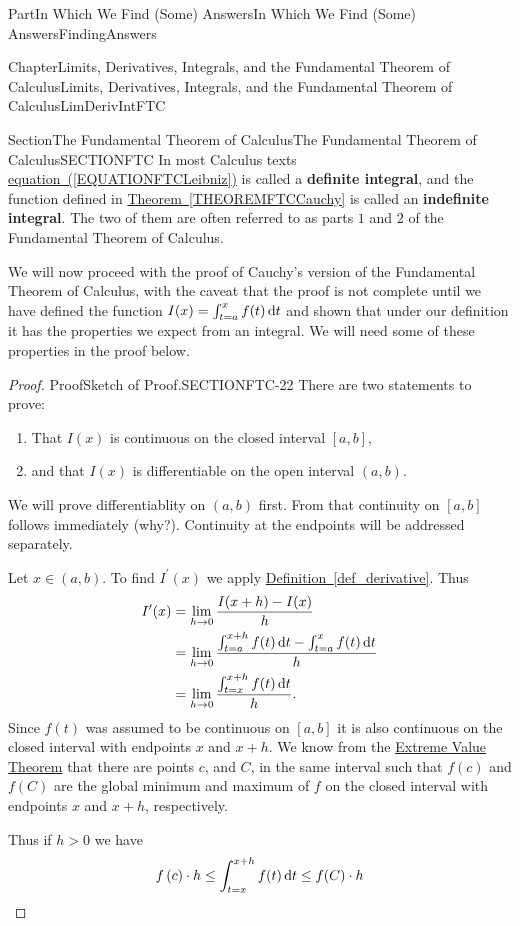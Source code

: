 \documentclass[oneside,10pt,]{book}
\newcommand{\xreffont}{\relax}
\newcommand{\terminology}[1]{\textbf{#1}}
\numberwithin{equation}{part}
\newcommand{\dx}[1]{\,{\rm d}#1}
\def\limit#1#2#3{{\displaystyle\lim_{#1\rightarrow #2}#3}}
\newcommand{\gt}{>}
\newcommand{\amp}{&}
\begin{document}
\begin{partptx}{Part}{In Which We Find (Some) Answers}{}{In Which We Find (Some) Answers}{}{}{FindingAnswers}
\begin{chapterptx}{Chapter}{Limits, Derivatives, Integrals, and the Fundamental Theorem of Calculus}{}{Limits, Derivatives, Integrals, and the Fundamental Theorem of Calculus}{}{}{LimDerivIntFTC}
\begin{sectionptx}{Section}{The Fundamental Theorem of Calculus}{}{The Fundamental Theorem of Calculus}{}{}{SECTIONFTC}
In most Calculus texts \hyperref[EQUATIONFTCLeibniz]{equation~({\xreffont\ref{EQUATIONFTCLeibniz}})} is called a \terminology{definite integral}, and the function defined in \hyperref[THEOREMFTCCauchy]{Theorem~{\xreffont\ref{THEOREMFTCCauchy}}} is called an \terminology{indefinite integral}. The two of them are often referred to as parts \(1\) and \(2\) of the Fundamental Theorem of Calculus.%
\par
We will now proceed with the proof of Cauchy's version of the Fundamental Theorem of Calculus, with the caveat that the proof is not complete until we have defined the function \(I(x)=\int_{t=a}^x f(t)\dx{t}\) and shown that under our definition it has the properties we expect from an integral. We will need some of these properties in the proof below.%
\begin{proof}{Proof}{Sketch of Proof.}{SECTIONFTC-22}
There are two statements to prove:%
\begin{enumerate}
\item{}That \(I(x)\) is continuous on the closed interval \([a,b]\),%
\item{}and that \(I(x)\) is differentiable on the open interval \((a,b)\).%
\end{enumerate}
We will prove differentiablity on \((a,b)\) first. From that continuity on \([a,b]\) follows immediately (why?). Continuity at the endpoints will be addressed separately.%
\par
Let \(x\in (a,b)\). To find \(I^\prime (x)\) we apply \hyperref[def_derivative]{Definition~{\xreffont\ref{def_derivative}}}. Thus%
\begin{align*}
I^\prime (x)\amp{} = \limit{h}{0}{\frac{I(x+h)-I(x)}{h}}\\
\amp{} =       \limit{h}{0}{\frac{\int_{t=a}^{x+h}f(t)\dx{t}-\int_{t=a}^x
f(t)\dx{t}}{h}}\\
\amp{}=\limit{h}{0}{\frac{\int_{t=x}^{x+h}f(t)\dx{t}}{h}}.
\end{align*}
        Since \(f(t)\) was assumed to be continuous on \([a,b]\) it is also continuous on the closed interval with endpoints \(x\) and \(x+h\). We know from the \hyperref[thm_EVT]{Extreme Value Theorem} that there are points \(c\), and \(C\), in the same interval such that \(f(c)\) and \(f(C)\) are the global minimum and maximum of \(f\) on the closed interval with endpoints \(x\) and  \(x+h\), respectively.%
\par
Thus if \(h\gt0\) we have%
\begin{equation*}
f\left(c\right)\cdot h\le
\int^{x+h}_{t=x}{f(t)\dx{t}}\le f(C)\cdot h

\end{equation*}
\end{proof}
\end{sectionptx}
\end{chapterptx}
\end{partptx}
\end{document}
